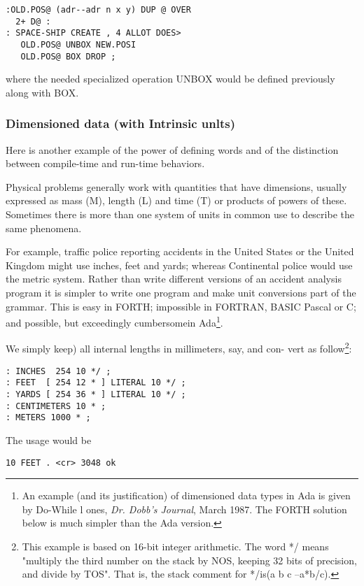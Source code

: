 \begin{lstlisting}
:OLD.POS@ (adr--adr n x y) DUP @ OVER
  2+ D@ :
: SPACE-SHIP CREATE , 4 ALLOT DOES>
   OLD.POS@ UNBOX NEW.POSI
   OLD.POS@ BOX DROP ;
\end{lstlisting}

where the needed specialized operation UNBOX would be defined previously along with BOX.

\subsubsection{Dimensioned data (with Intrinsic unlts)}
Here is another example of the power of defining words and of the distinction between compile-time and run-time behaviors.

Physical problems generally work with quantities that have dimensions, usually expressed as mass (M), length (L) and time (T) or products of powers of these. Sometimes there is more than one system of units in common use to describe the same phenomena.

For example, traffic police reporting accidents in the United States or the United Kingdom might use inches, feet and yards; whereas Continental police would use the metric system. Rather than write different versions of an accident analysis program it is simpler to write one program and make unit conversions part of the grammar. This is easy in FORTH; impossible in FORTRAN, BASIC Pascal or C; and possible, but exceedingly cumbersomein Ada\footnote{An example (and its justification) of dimensioned data types in Ada is given by Do-While l ones, \textit{Dr. Dobb's Journal}, March 1987. The FORTH solution below is much simpler than the Ada version.}.

We simply keep) all internal lengths in millimeters, say, and con-
vert as follow\footnote{This example is based on 16-bit integer arithmetic. The word */ means "multiply the third number on the stack by NOS, keeping 32 bits of precision, and divide by TOS". That is, the stack comment for */is(a b c --a*b/c).}:

\begin{lstlisting}
: INCHES  254 10 */ ;
: FEET  [ 254 12 * ] LITERAL 10 */ ;
: YARDS [ 254 36 * ] LITERAL 10 */ ;
: CENTIMETERS 10 * ;
: METERS 1000 * ;
\end{lstlisting}

The usage would be
\begin{lstlisting}
10 FEET . <cr> 3048 ok
\end{lstlisting}

